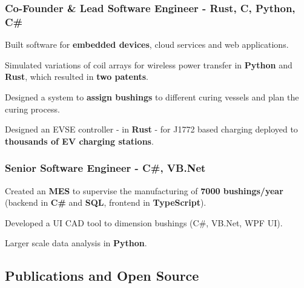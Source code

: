 \begin{timeline}
    \subsubsection{Co-Founder \& Lead Software Engineer - Rust, C, Python, C\#}
    Built software for \textbf{embedded devices}, cloud services and web applications.
    \begin{tightemize}
        \item Simulated variations of coil arrays for wireless power transfer in \textbf{Python} and \textbf{Rust}, which resulted in \textbf{two patents}.
        \item Designed a system to \textbf{assign bushings} to different curing vessels and plan the curing process.
        \item Designed an EVSE controller - in \textbf{Rust} - for J1772 based charging deployed to \textbf{thousands of EV charging stations}.
    \end{tightemize}
    \sectionsep

    \subsubsection{Senior Software Engineer - C\#, VB.Net}
    \begin{tightemize}
        \item Created an \textbf{MES} to supervise the manufacturing of \textbf{7000 bushings/year} (backend in \textbf{C\#} and \textbf{SQL}, frontend in \textbf{TypeScript}).
        \item Developed a UI CAD tool to dimension bushings (C\#, VB.Net, WPF UI).
        \item Larger scale data analysis in \textbf{Python}.
    \end{tightemize}
    \sectionsep


    
    \subsection{Publications and Open Source}


\end{timeline}

